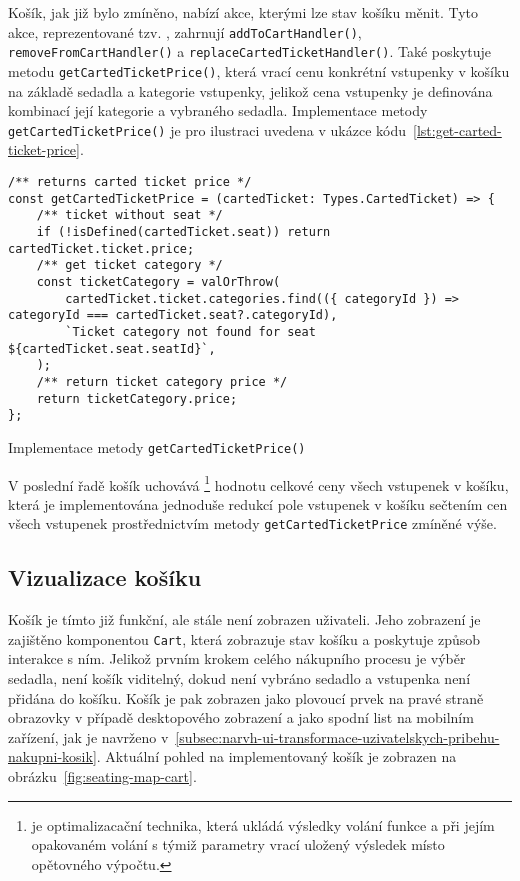 Košík, jak již bylo zmíněno, nabízí akce, kterými lze stav košíku měnit.
Tyto akce, reprezentované tzv. , zahrnují \texttt{addToCartHandler()}, \texttt{removeFromCartHandler()} a \texttt{replaceCartedTicketHandler()}.
Také poskytuje metodu \texttt{getCartedTicketPrice()}, která vrací cenu konkrétní vstupenky v košíku na základě sedadla a kategorie vstupenky, jelikož cena vstupenky je definována kombinací její kategorie a vybraného sedadla.
Implementace metody \texttt{getCartedTicketPrice()} je pro ilustraci uvedena v ukázce kódu~\ref{lst:get-carted-ticket-price}.

\begin{listing}[!h]
\begin{verbatim}
/** returns carted ticket price */
const getCartedTicketPrice = (cartedTicket: Types.CartedTicket) => {
	/** ticket without seat */
	if (!isDefined(cartedTicket.seat)) return cartedTicket.ticket.price;
	/** get ticket category */
	const ticketCategory = valOrThrow(
		cartedTicket.ticket.categories.find(({ categoryId }) => categoryId === cartedTicket.seat?.categoryId),
		`Ticket category not found for seat ${cartedTicket.seat.seatId}`,
	);
	/** return ticket category price */
	return ticketCategory.price;
};
\end{verbatim}
\caption{Implementace metody \texttt{getCartedTicketPrice()}}
\label{lst:get-carted-ticket-price}
\end{listing}

V poslední řadě košík uchovává \footnote{ je optimalizacační technika, která ukládá výsledky volání funkce a při jejím opakovaném volání s týmiž parametry vrací uložený výsledek místo opětovného výpočtu.} hodnotu celkové ceny všech vstupenek v košíku, která je implementována jednoduše redukcí pole vstupenek v košíku sečtením cen všech vstupenek prostřednictvím metody \texttt{getCartedTicketPrice} zmíněné výše.

\subsection{Vizualizace košíku}
\label{subsec:implementace-kosik-vizualizace}
Košík je tímto již funkční, ale stále není zobrazen uživateli.
Jeho zobrazení je zajištěno komponentou \texttt{Cart}, která zobrazuje stav košíku a poskytuje způsob interakce s ním.
Jelikož prvním krokem celého nákupního procesu je výběr sedadla, není košík viditelný, dokud není vybráno sedadlo a vstupenka není přidána do košíku.
Košík je pak zobrazen jako plovoucí prvek na pravé straně obrazovky v případě desktopového zobrazení a jako spodní list na mobilním zařízení, jak je navrženo v~\ref{subsec:narvh-ui-transformace-uzivatelskych-pribehu-nakupni-kosik}.
Aktuální pohled na implementovaný košík je zobrazen na obrázku~\ref{fig:seating-map-cart}.

